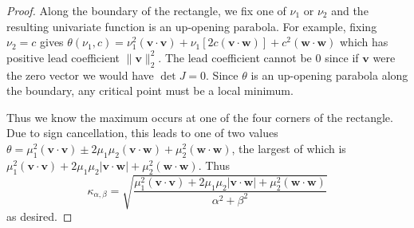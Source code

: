 \documentclass[3p, authoryear, square]{elsarticle}
\theoremstyle{definition}
\begin{document}
\begin{proof}
Along the boundary of the rectangle,
we fix one of \(\nu_1\) or \(\nu_2\) and the resulting univariate function is
an up-opening parabola. For example, fixing \(\nu_2 = c\) gives
\(\theta(\nu_1, c) =
\nu_1^2 \left(\bm{v} \cdot \bm{v}\right) +
\nu_1\left[2 c \left(\bm{v} \cdot \bm{w}\right)\right] +
c^2 \left(\bm{w} \cdot \bm{w}\right)\) which has positive lead coefficient
\(\|\bm{v}\|_2^2\). The lead coefficient cannot be \(0\) since if \(\bm{v}\)
were the zero vector we would have \(\det J = 0\).
Since \(\theta\) is an up-opening parabola along the boundary, any critical
point must be a local minimum.

Thus we know the maximum occurs at one of the four corners of the
rectangle. Due to sign cancellation, this leads to one of two values
\(\theta =
\mu_1^2 \left(\bm{v} \cdot \bm{v}\right) \pm
2 \mu_1 \mu_2 \left(\bm{v} \cdot \bm{w}\right) +
\mu_2^2 \left(\bm{w} \cdot \bm{w}\right)\), the largest of which is
\(\mu_1^2 \left(\bm{v} \cdot \bm{v}\right) +
2 \mu_1 \mu_2 \left|\bm{v} \cdot \bm{w}\right| +
\mu_2^2 \left(\bm{w} \cdot \bm{w}\right)\). Thus
\begin{equation}\label{eq:intersect-cond-num-too}
\kappa_{\alpha, \beta} = \sqrt{\frac{\mu_1^2
  \left(\bm{v} \cdot \bm{v}\right) +
  2 \mu_1 \mu_2 \left|\bm{v} \cdot \bm{w}\right| +
  \mu_2^2 \left(\bm{w} \cdot \bm{w}\right)}{\alpha^2 + \beta^2}}
\end{equation}
as desired.
\end{proof}
\end{document}
